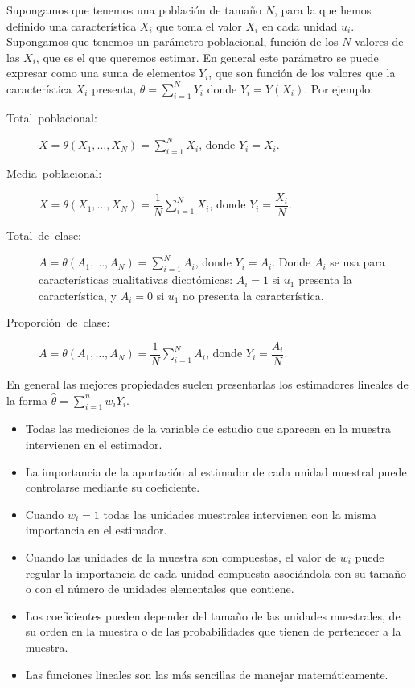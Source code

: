 Supongamos que tenemos una poblaci\'on de tama\~no $N$, para la que hemos
definido una caracter\'istica $X_{i}$ que toma el valor $X_{i}$ en
cada unidad $u_{i}$. Supongamos que tenemos un par\'ametro poblacional,
funci\'on de los $N$ valores de las $X_{i}$, que es el que queremos
estimar. En general este par\'ametro se puede expresar como una suma
de elementos $Y_{i}$, que son funci\'on de los valores que la caracter\'istica
$X_{i}$ presenta, $\theta=\sum_{i=1}^{N}Y_{i}$ donde $Y_{i}=Y\left(X_{i}\right)$.
Por ejemplo:
\begin{description}
\item [{Total~poblacional:}] $X=\theta\left(X_{1},\ldots,X_{N}\right)=\sum_{i=1}^{N}X_{i}$,
donde $Y_{i}=X_{i}$.
\item [{Media~poblacional:}] $X=\theta\left(X_{1},\ldots,X_{N}\right)=\dfrac{1}{N}\sum_{i=1}^{N}X_{i}$,
donde $Y_{i}=\dfrac{X_{i}}{N}$.
\item [{Total~de~clase:}] $A=\theta\left(A_{1},\ldots,A_{N}\right)=\sum_{i=1}^{N}A_{i}$,
donde $Y_{i}=A_{i}$. Donde $A_{i}$ se usa para caracter\'isticas cualitativas
dicot\'omicas: $A_{i}=1$ si $u_{1}$ presenta la caracter\'istica, y
$A_{i}=0$ si $u_{1}$ no presenta la caracter\'istica.
\item [{Proporci\'on~de~clase:}] $A=\theta\left(A_{1},\ldots,A_{N}\right)=\dfrac{1}{N}\sum_{i=1}^{N}A_{i}$,
donde $Y_{i}=\dfrac{A_{i}}{N}$.
\end{description}
En general las mejores propiedades suelen presentarlas los estimadores
lineales de la forma $\hat{\theta}=\sum_{i=1}^{n}w_{i}Y_{i}$.
\begin{itemize}
\item Todas las mediciones de la variable de estudio que aparecen en la
muestra intervienen en el estimador.
\item La importancia de la aportaci\'on al estimador de cada unidad muestral
puede controlarse mediante su coeficiente.
\item Cuando $w_{i}=1$ todas las unidades muestrales intervienen con la
misma importancia en el estimador.
\item Cuando las unidades de la muestra son compuestas, el valor de $w_{i}$
puede regular la importancia de cada unidad compuesta asoci\'andola
con su tama\~no o con el n\'umero de unidades elementales que contiene.
\item Los coeficientes pueden depender del tama\~no de las unidades muestrales,
de su orden en la muestra o de las probabilidades que tienen de pertenecer
a la muestra.
\item Las funciones lineales son las m\'as sencillas de manejar matem\'aticamente.
\end{itemize}

